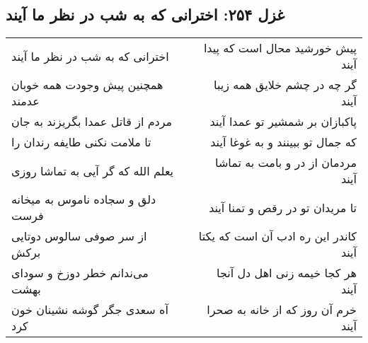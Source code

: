 \begin{center}
\section*{غزل ۲۵۴: اخترانی که به شب در نظر ما آیند}
\label{sec:254}
\begin{longtable}{l p{0.5cm} r}
اخترانی که به شب در نظر ما آیند
&&
پیش خورشید محال است که پیدا آیند
\\
همچنین پیش وجودت همه خوبان عدمند
&&
گر چه در چشم خلایق همه زیبا آیند
\\
مردم از قاتل عمدا بگریزند به جان
&&
پاکبازان بر شمشیر تو عمدا آیند
\\
تا ملامت نکنی طایفه رندان را
&&
که جمال تو ببینند و به غوغا آیند
\\
یعلم الله که گر آیی به تماشا روزی
&&
مردمان از در و بامت به تماشا آیند
\\
دلق و سجاده ناموس به میخانه فرست
&&
تا مریدان تو در رقص و تمنا آیند
\\
از سر صوفی سالوس دوتایی برکش
&&
کاندر این ره ادب آن است که یکتا آیند
\\
می‌ندانم خطر دوزخ و سودای بهشت
&&
هر کجا خیمه زنی اهل دل آنجا آیند
\\
آه سعدی جگر گوشه نشینان خون کرد
&&
خرم آن روز که از خانه به صحرا آیند
\\
\end{longtable}
\end{center}
